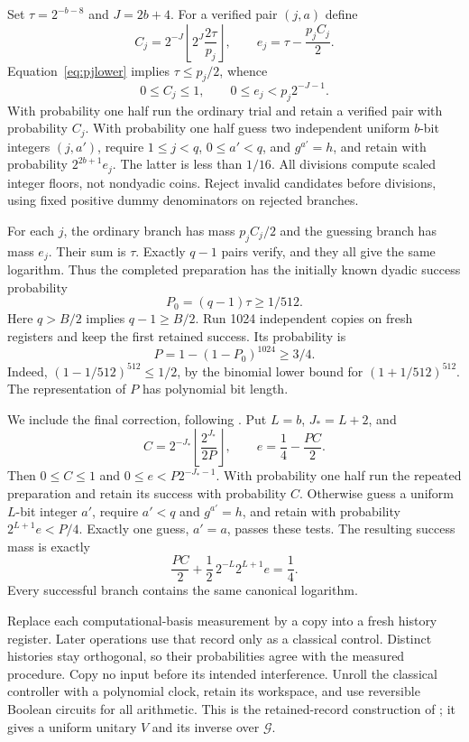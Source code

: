\documentclass[11pt,reqno]{amsart}
\numberwithin{equation}{section}
\theoremstyle{definition}
\theoremstyle{remark}
\begin{document}
Set $\tau=2^{-b-8}$ and $J=2b+4$. For a verified pair $(j,a)$ define
\[
 C_j=2^{-J}\left\lfloor2^J\frac{2\tau}{p_j}\right\rfloor,
 \qquad e_j=\tau-\frac{p_jC_j}{2}.
\]
Equation~\eqref{eq:pjlower} implies $\tau\le p_j/2$, whence
\[
 0\le C_j\le1,\qquad 0\le e_j<p_j2^{-J-1}.
\]
With probability one half run the ordinary trial and retain a verified
pair with probability $C_j$. With probability one half guess two
independent uniform $b$-bit integers $(j,a')$, require $1\le j<q$,
$0\le a'<q$, and $g^{a'}=h$, and retain with probability
$2^{2b+1}e_j$. The latter is less than $1/16$.
All divisions compute scaled integer floors, not nondyadic coins.
Reject invalid candidates before divisions, using fixed positive dummy
denominators on rejected branches.

For each $j$, the ordinary branch has mass $p_jC_j/2$ and the guessing
branch has mass $e_j$. Their sum is $\tau$. Exactly $q-1$ pairs verify,
and they all give the same logarithm. Thus the completed preparation
has the initially known dyadic success probability
\[
 P_0=(q-1)\tau\ge1/512.
\]
Here $q>B/2$ implies $q-1\ge B/2$. Run 1024 independent copies on
fresh registers and keep the first retained success. Its probability is
\[
 P=1-(1-P_0)^{1024}\ge3/4.
\]
Indeed, $(1-1/512)^{512}\le1/2$, by the binomial lower bound for
$(1+1/512)^{512}$. The representation of $P$ has polynomial bit length.

We include the final correction, following \cite[Lemma 5.3]{OpenAI}.
Put $L=b$, $J_*=L+2$, and
\[
 C=2^{-J_*}\left\lfloor\frac{2^{J_*}}{2P}\right\rfloor,
 \qquad e=\frac14-\frac{PC}{2}.
\]
Then $0\le C\le1$ and $0\le e<P2^{-J_*-1}$.
With probability one half run the repeated preparation and retain its
success with probability $C$. Otherwise guess a uniform $L$-bit
integer $a'$, require $a'<q$ and $g^{a'}=h$, and retain with
probability $2^{L+1}e<P/4$. Exactly one guess, $a'=a$, passes these
tests. The resulting success mass is exactly
\[
 \frac{PC}{2}+\frac12\,2^{-L}2^{L+1}e=\frac14.
\]
Every successful branch contains the same canonical logarithm.

Replace each computational-basis measurement by a copy into a fresh
history register. Later operations use that record only as a classical
control. Distinct histories stay orthogonal, so their probabilities
agree with the measured procedure. Copy no input before its intended
interference. Unroll the classical controller with a polynomial clock,
retain its workspace, and use reversible Boolean circuits for all
arithmetic. This is the retained-record construction of
\cite[Lemma 2.2]{OpenAI}; it gives a uniform unitary $V$ and its inverse
over $\mathcal G$.
\end{document}
